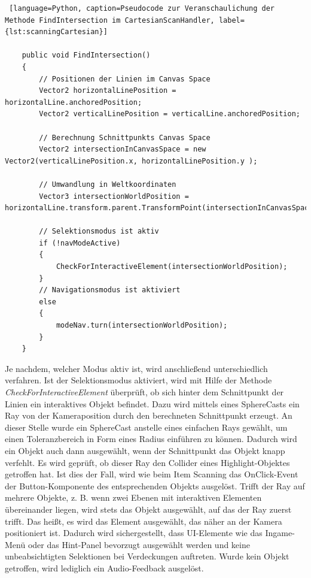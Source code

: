 \begin{lstlisting} [language=Python, caption=Pseudocode zur Veranschaulichung der Methode FindIntersection im CartesianScanHandler, label={lst:scanningCartesian}]

    public void FindIntersection()
    {
        // Positionen der Linien im Canvas Space
        Vector2 horizontalLinePosition = horizontalLine.anchoredPosition;
        Vector2 verticalLinePosition = verticalLine.anchoredPosition;
        
        // Berechnung Schnittpunkts Canvas Space
        Vector2 intersectionInCanvasSpace = new Vector2(verticalLinePosition.x, horizontalLinePosition.y );
        
        // Umwandlung in Weltkoordinaten
        Vector3 intersectionWorldPosition = horizontalLine.transform.parent.TransformPoint(intersectionInCanvasSpace);

        // Selektionsmodus ist aktiv
        if (!navModeActive)
	    {
            CheckForInteractiveElement(intersectionWorldPosition);
        }
        // Navigationsmodus ist aktiviert
        else
        {
            modeNav.turn(intersectionWorldPosition);
        }
    }

\end{lstlisting}

Je nachdem, welcher Modus aktiv ist, wird anschließend unterschiedlich verfahren. Ist der Selektionsmodus aktiviert, wird mit Hilfe der Methode \textit{CheckForInteractiveElement} überprüft, ob sich hinter dem Schnittpunkt der Linien ein interaktives Objekt befindet. Dazu wird mittels eines SphereCasts ein Ray von der Kameraposition durch den berechneten Schnittpunkt erzeugt. An dieser Stelle wurde ein SphereCast anstelle eines einfachen Rays gewählt, um einen Toleranzbereich in Form eines Radius einführen zu können. Dadurch wird ein Objekt auch dann ausgewählt, wenn der Schnittpunkt das Objekt knapp verfehlt. Es wird geprüft, ob dieser Ray den Collider eines Highlight-Objektes getroffen hat. Ist dies der Fall, wird wie beim Item Scanning das OnClick-Event der Button-Komponente des entsprechenden Objekts ausgelöst. Trifft der Ray auf mehrere Objekte, z. B.  wenn zwei Ebenen mit interaktiven Elementen übereinander liegen, wird stets das Objekt ausgewählt, auf das der Ray zuerst trifft. Das heißt, es wird das Element ausgewählt, das näher an der Kamera positioniert ist. Dadurch wird sichergestellt, dass UI-Elemente wie das Ingame-Menü oder das Hint-Panel bevorzugt ausgewählt werden und keine unbeabsichtigten Selektionen bei Verdeckungen auftreten. Wurde kein Objekt getroffen, wird lediglich ein Audio-Feedback ausgelöst. 

